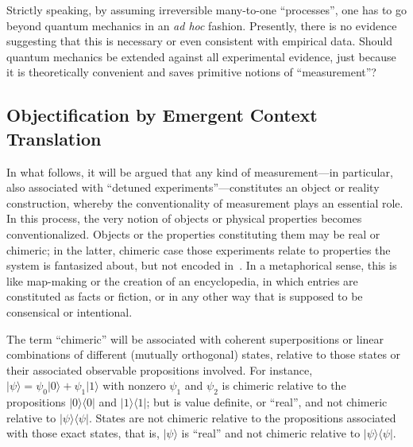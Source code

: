 \documentclass[entropy,article,accept,oneauthor,pdftex]{Definitions/mdpi}
\begin{document}
Strictly speaking, by assuming irreversible many-to-one ``processes'', one has to go beyond quantum mechanics in an {\it ad hoc} fashion.
Presently, there is no evidence suggesting that this is necessary or even consistent with empirical data.
Should quantum mechanics be extended against all experimental evidence,
just because it is theoretically convenient and saves primitive notions of ``measurement''?



\subsection{Objectification by Emergent Context Translation}

In what follows, it will be argued that any kind of measurement---in particular, also associated with ``detuned experiments''---constitutes an object or reality construction,
whereby the conventionality of measurement plays an essential role.
In this process, the very notion of objects or physical properties becomes conventionalized.
Objects or the properties constituting them may be real or chimeric; in the latter, chimeric case those experiments
relate to properties the system is fantasized about, but not encoded in~\cite{zeil-99}.
In a metaphorical sense, this is like map-making or the creation of an encyclopedia, in which entries are constituted as facts or fiction,
or in any other way that is supposed to be consensical or intentional.

The term ``chimeric'' will be associated with coherent superpositions or linear combinations of different (mutually orthogonal) states,
relative to those states or their associated observable propositions involved.
For instance, $\vert \psi \rangle =  \psi_0 \vert 0 \rangle + \psi_1 \vert 1 \rangle$ with nonzero $\psi_1$ and $\psi_2$ is chimeric relative to
the propositions $\vert 0 \rangle \langle 0 \vert$ and $\vert 1 \rangle \langle 1 \vert$;
but is value definite, or ``real'', and not chimeric relative to $\vert \psi \rangle \langle \psi \vert$.
States are not chimeric relative to the propositions associated with those exact states,
that is, $\vert \psi \rangle$ is ``real'' and not chimeric relative to $\vert \psi \rangle \langle \psi \vert$.
\end{document}
